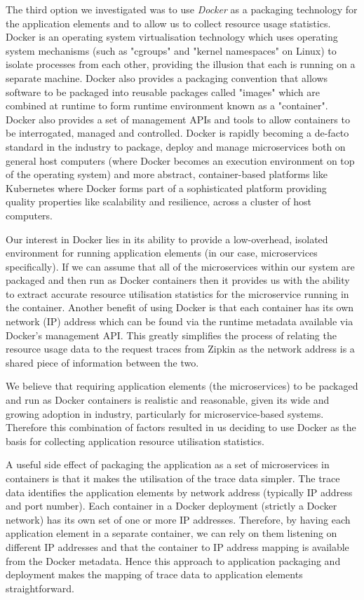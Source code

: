 The third option we investigated was to use \emph{Docker} \cite{docker2018} as a packaging technology for the application elements and to allow us to collect resource usage statistics.  Docker is an operating system virtualisation technology which uses operating system mechanisms (such as "cgroups" and "kernel namespaces" on Linux) to isolate processes from each other, providing the illusion that each is running on a separate machine.  Docker also provides a packaging convention that allows software to be packaged into reusable packages called "images" which are combined at runtime to form runtime environment known as a "container".  Docker also provides a set of management APIs and tools to allow containers to be interrogated, managed and controlled.  Docker is rapidly becoming a de-facto standard in the industry to package, deploy and manage microservices both on general host computers (where Docker becomes an execution environment on top of the operating system) and more abstract, container-based platforms like Kubernetes \cite{kubernetes2018} where Docker forms part of a sophisticated platform providing quality properties like scalability and resilience, across a cluster of host computers.

Our interest in Docker lies in its ability to provide a low-overhead, isolated environment for running application elements (in our case, microservices specifically).  If we can assume that all of the microservices within our system are packaged and then run as Docker containers then it provides us with the ability to extract accurate resource utilisation statistics for the microservice running in the container.  Another benefit of using Docker is that each container has its own network (IP) address which can be found via the runtime metadata available via Docker's management API.  This greatly simplifies the process of relating the resource usage data to the request traces from Zipkin as the network address is a shared piece of information between the two.

We believe that requiring application elements (the microservices) to be packaged and run as Docker containers is realistic and reasonable, given its wide and growing adoption in industry, particularly for microservice-based systems.  Therefore this combination of factors resulted in us deciding to use Docker as the basis for collecting application resource utilisation statistics.

A useful side effect of packaging the application as a set of microservices in containers is that it makes the utilisation of the trace data simpler.  The trace data identifies the application elements by network address (typically IP address and port number).  Each container in a Docker deployment (strictly a Docker network) has its own set of one or more IP addresses.  Therefore, by having each application element in a separate container, we can rely on them listening on different IP addresses and that the container to IP address mapping is available from the Docker metadata.  Hence this approach to application packaging and deployment makes the mapping of trace data to application elements straightforward. 


